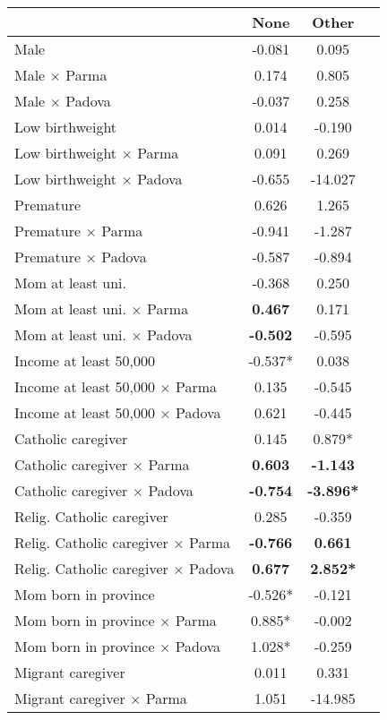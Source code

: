 \begin{tabular}{l c c c}
\toprule
& None & Other \\
\midrule
Male &    -0.081 &     0.095 \\
Male $\times$ Parma &     0.174 &     0.805 \\
Male $\times$ Padova &    -0.037 &     0.258 \\
Low birthweight &     0.014 &    -0.190 \\
Low birthweight $\times$ Parma &     0.091 &     0.269 \\
Low birthweight $\times$ Padova &    -0.655 &   -14.027 \\
Premature &     0.626 &     1.265 \\
Premature $\times$ Parma &    -0.941 &    -1.287 \\
Premature $\times$ Padova &    -0.587 &    -0.894 \\
Mom at least uni. &    -0.368 &     0.250 \\
Mom at least uni. $\times$ Parma & \textbf{    0.467} &     0.171 \\
Mom at least uni. $\times$ Padova & \textbf{   -0.502} &    -0.595 \\
Income at least 50,000 & -0.537* &     0.038 \\
Income at least 50,000 $\times$ Parma &     0.135 &    -0.545 \\
Income at least 50,000 $\times$ Padova &     0.621 &    -0.445 \\
Catholic caregiver &     0.145 & 0.879* \\
Catholic caregiver $\times$ Parma & \textbf{    0.603} & \textbf{   -1.143} \\
Catholic caregiver $\times$ Padova & \textbf{   -0.754} & \textbf{-3.896*} \\
Relig. Catholic caregiver &     0.285 &    -0.359 \\
Relig. Catholic caregiver $\times$ Parma & \textbf{   -0.766} & \textbf{    0.661} \\
Relig. Catholic caregiver $\times$ Padova & \textbf{    0.677} & \textbf{2.852*} \\
Mom born in province & -0.526* &    -0.121 \\
Mom born in province $\times$ Parma & 0.885* &    -0.002 \\
Mom born in province $\times$ Padova & 1.028* &    -0.259 \\
Migrant caregiver &     0.011 &     0.331 \\
Migrant caregiver $\times$ Parma &     1.051 &   -14.985 \\

\end{tabular}
